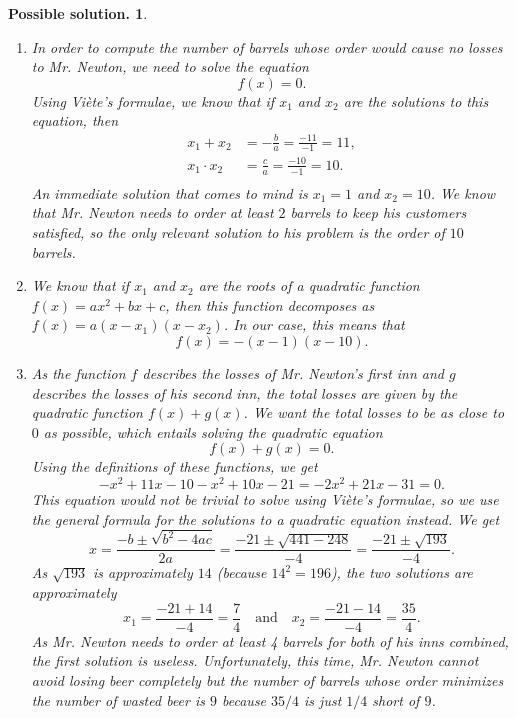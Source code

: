 \documentclass[a4paper,11pt]{article}
\newtheorem*{solution}{Possible solution.}
\begin{document}
\begin{solution}
\begin{enumerate}
   looks like a `hill' in this case because $a = -1 < 0$. This means that $f$
   does have a maximum at its vertex, whose first coordinate we know is $x = -b
   / 2a$. In our case, we get that $x = -11 / (-2) = 5.5$ so Mr. Newton suffers
   the most losses if he orders either 5 or 6 barrels of beer.
  \item In order to compute the number of barrels whose order would cause no
   losses to Mr. Newton, we need to solve the equation
   \[
    f(x) = 0.
   \]
   Using Viète's formulae, we know that if $x_1$ and $x_2$ are the solutions to
   this equation, then
   \begin{equation*}
    \begin{split}
     x_1 + x_2 &= -\frac{b}{a} = \frac{-11}{-1} = 11,\\
     x_1 \cdot x_2 &= \frac{c}{a} = \frac{-10}{-1} = 10.\\
    \end{split}
   \end{equation*}
   An immediate solution that comes to mind is $x_1 = 1$ and $x_2 = 10$. We know
   that Mr. Newton needs to order at least $2$ barrels to keep his customers
   satisfied, so the only relevant solution to his problem is the order of $10$
   barrels.
  \item We know that if $x_1$ and $x_2$ are the roots of a quadratic function
   $f(x) = ax^2 + bx + c$, then this function decomposes as $f(x) = a(x -
   x_1)(x-x_2)$. In our case, this means that
   \[
    f(x) = -(x - 1)(x - 10).
   \]
  \item As the function $f$ describes the losses of Mr. Newton's first inn and
   $g$ describes the losses of his second inn, the total losses are given by the
   quadratic function $f(x) + g(x)$. We want the total losses to be as close to
   $0$ as possible, which entails solving the quadratic equation
   \[
    f(x) + g(x) = 0.
   \]
   Using the definitions of these functions, we get
   \[
    -x^2 + 11x - 10 - x^2 + 10x - 21 = -2x^2 + 21x - 31 = 0.
   \]
   This equation would not be trivial to solve using Viète's formulae, so we use
   the general formula for the solutions to a quadratic equation instead. We get
   \[
    x = \frac{-b \pm \sqrt{b^2 - 4ac}}{2a} = \frac{-21 \pm \sqrt{441 - 248}}{-4}
    = \frac{-21 \pm \sqrt{193}}{-4}.
   \]
   As $\sqrt{193}$ is approximately $14$ (because $14^2 = 196$), the two
   solutions are approximately
   \[
    x_1 = \frac{-21 + 14}{-4} = \frac{7}{4} \quad \text{and} \quad x_2 =
    \frac{-21 - 14}{-4} = \frac{35}{4}.
   \]
   As Mr. Newton needs to order at least 4 barrels for both of his inns
   combined, the first solution is useless. Unfortunately, this time, Mr. Newton
   cannot avoid losing beer completely but the number of barrels whose order
   minimizes the number of wasted beer is $9$ because $35 / 4$ is just $1 / 4$
   short of $9$.
 \end{enumerate}
\end{solution}
\end{document}
